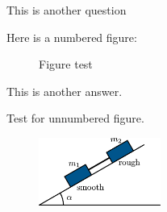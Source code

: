 \documentclass[solutionsatend,twocolumnsolutions]{ouunit}
\begin{document}
\lipsum[133]

\begin{exercise}\label{exe-fig-test}
This is another question
\begin{solution}
Here is a numbered figure:
\begin{figure}
\caption{Figure test \label{fig-placement-test}}
\end{figure}
This is another answer.
\end{solution}
\end{exercise}

Test for unnumbered figure.

\begin{figure}
\includegraphics[width=4cm]{test}
\end{figure}
\end{document}
